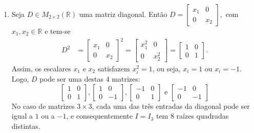 \documentclass[12pt,a4paper]{article}
\newcommand*\R{\mathbb{R}}
\begin{document}
\begin{enumerate}
\item Seja $D \in M_{2\times 2} (\R)$ uma matriz diagonal. Então
$
D = \begin{bmatrix}
x_1 & 0\\
0 & x_2
\end{bmatrix},
$
com $x_1, x_2 \in \R$
e tem-se
\begin{align*}
D^2
& =
\begin{bmatrix}
x_1 & 0 \\
0 & x_2
\end{bmatrix}^2
=
\begin{bmatrix}
x_1^2 & 0 \\
0 & x_2^2
\end{bmatrix}
=
\begin{bmatrix}
1 & 0\\
0 & 1
\end{bmatrix}.
\end{align*}
Assim, os escalares $x_1$ e $x_2$ satisfazem $x_i^2 = 1$, ou seja, $x_i = 1$ ou $x_i = -1$. Logo, $D$ pode ser uma destas 4 matrizes:
\[
\begin{bmatrix}
1 & 0\\
0 & 1
\end{bmatrix},
\begin{bmatrix}
1 & 0\\
0 & -1
\end{bmatrix},
\begin{bmatrix}
-1 & 0\\
0 & 1
\end{bmatrix}
\text{ e }
\begin{bmatrix}
-1 & 0\\
0 & -1
\end{bmatrix}
\]
No caso de matrizes $3 \times 3$, cada uma das três entradas da diagonal pode ser igual a $1$ ou a $-1$, e consequentemente $I = I_3$ tem 8 raízes quadradas distintas.


\end{enumerate}
\end{document}
